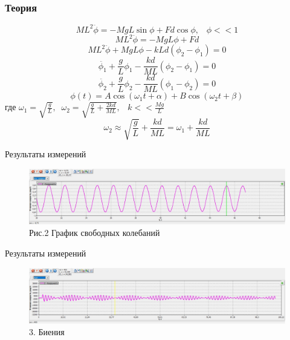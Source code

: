 \documentclass[xcolor=table]{beamer}
\begin{document}
\begin{frame}\frametitle{Теория}
    $$ML^2 \ddot{\phi} = - MgL \sin{\phi} + Fd\cos{\phi}, \;\;\; \phi << 1$$
    $$ML^2 \ddot{\phi} = - MgL \phi + Fd$$
    $$ML^2 \ddot{\phi} + MgL \phi - kLd (\phi_2 - \phi_1) = 0$$
    $$\ddot{\phi_1} + \frac{g}{L} \phi_1 - \frac{kd}{ML} (\phi_2 - \phi_1) = 0$$
    $$\ddot{\phi_2} + \frac{g}{L} \phi_2 - \frac{kd}{ML} (\phi_1 - \phi_2) = 0$$
    $$\phi(t) = A\cos{(\omega_1 t + \alpha)} + B\cos{(\omega_2 t + \beta)}$$
    \centering
    где $\omega_1 = \sqrt{\frac{g}{L}}, \;\; \omega_2 = \sqrt{\frac{g}{L} + \frac{2kd}{ML}}, \;\;\; k << \frac{Mg}{L}$
    $$\omega_2 \approx \sqrt{\frac{g}{L}} + \frac{kd}{ML} = \omega_1 + \frac{kd}{ML}$$
\end{frame}


\begin{frame}{Результаты измерений}
    \begin{figure}
        \centering
        \includegraphics[scale = 0.8]{images/Oscillation period.jpg}
        \caption{Рис.2 График свободных колебаний}
        \label{fig:my_label}
    \end{figure}
\end{frame}


\begin{frame}{Результаты измерений}
    \begin{figure}[h]
        \centering
        \includegraphics[scale = 0.6]{images/beats.jpg}
        \caption{3. Биения}
        \label{}
    \end{figure}
\end{frame}
\end{document}
